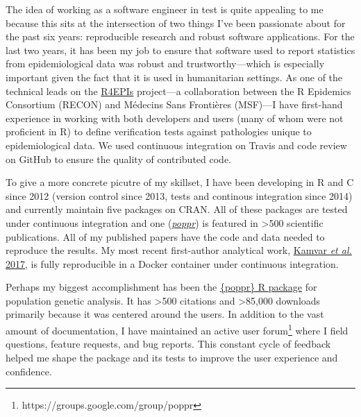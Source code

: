 

The idea of working as a software engineer in test is quite appealing to me
because this sits at the intersection of two things I've been passionate about
for the past six years: reproducible research and robust software applications.
For the last two years, it has been my job to ensure that software used to
report statistics from epidemiological data was robust and trustworthy---which
is especially important given the fact that it is used in humanitarian
settings. As one of the technical leads on the
\href{https://r4epis.netlify.com}{R4EPIs} project---a collaboration between the
R Epidemics Consortium (RECON) and M\'{e}decins Sans Fronti\`{e}res (MSF)---I
have first-hand experience in working with both developers and users (many of
whom were not proficient in R) to define verification tests against pathologies
unique to epidemiological data. We used continuous integration on Travis and
code review on GitHub to ensure the quality of contributed code.

\vspace{1ex}

To give a more concrete picutre of my skillset, I have been developing in R and
C since 2012 (version control since 2013, tests and continous integration since 
2014) and currently maintain five packages on CRAN. All of these packages are
tested under continuous integration and one
(\href{https://grunwaldlab.github.io/poppr}{\textit{poppr}}) is featured in
\textgreater500 scientific publications. All of my published papers have the
code and data needed to reproduce the results. My most recent first-author 
analytical work, \href{https://peerj.com/articles/4152/}{Kamvar \textit{et al.}
2017}, is fully reproducible in a Docker container under continuous integration. 

\vspace{1ex}


Perhaps my biggest accomplishment has been the
\href{https://grunwaldlab.github.io/poppr}{\{poppr\} R package} for population
genetic analysis. It has \textgreater500 citations and \textgreater85,000
downloads primarily because it was centered around the users. In addition to the
vast amount of documentation, I have maintained an active user 
forum\footnote{https://groups.google.com/group/poppr} where I field questions,
feature requests, and bug reports. This constant cycle of feedback helped me
shape the package and its tests to improve the user experience and confidence.

